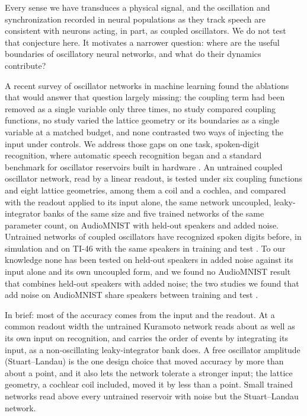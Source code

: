 \documentclass[10pt]{article}
\newcounter{none} %
\begin{document}
Every sense we have transduces a physical signal, and the oscillation
and synchronization recorded in neural populations as they track speech
\citep{assaneo2020, doelling2023, pittman-polletta2021, dogonasheva2026}
are consistent with neurons acting, in part, as coupled oscillators. We
do not test that conjecture here. It motivates a narrower question:
where are the useful boundaries of oscillatory neural networks, and what
do their dynamics contribute?

A recent survey of oscillator networks in machine learning
\citep{kryski2026} found the ablations that would answer that question
largely missing: the coupling term had been removed as a single variable
only three times, no study compared coupling functions, no study varied
the lattice geometry or its boundaries as a single variable at a matched
budget, and none contrasted two ways of injecting the input under
controls. We address those gaps on one task, spoken-digit recognition,
where automatic speech recognition began \citep{davis1952} and a
standard benchmark for oscillator reservoirs built in hardware
\citep{torrejon2017, shougat2023}. An untrained coupled oscillator
network, read by a linear readout, is tested under six coupling
functions and eight lattice geometries, among them a coil and a cochlea,
and compared with the readout applied to its input alone, the same
network uncoupled, leaky-integrator banks of the same size and five
trained networks of the same parameter count, on AudioMNIST
\citep{becker2024} with held-out speakers and added noise. Untrained
networks of coupled oscillators have recognized spoken digits before, in
simulation and on TI-46 with the same speakers in training and test
\citep{opala2019, coulombe2017}. To our knowledge none has been tested
on held-out speakers in added noise against its input alone and its own
uncoupled form, and we found no AudioMNIST result that combines held-out
speakers with added noise; the two studies we found that add noise on
AudioMNIST share speakers between training and test
\citep{beoletto2026, young2026}.

In brief: most of the accuracy comes from the input and the readout. At
a common readout width the untrained Kuramoto network reads about as
well as its own input on recognition, and carries the order of events by
integrating its input, as a non-oscillating leaky-integrator bank does.
A free oscillator amplitude (Stuart--Landau) is the one design choice
that moved accuracy by more than about a point, and it also lets the
network tolerate a stronger input; the lattice geometry, a cochlear coil
included, moved it by less than a point. Small trained networks read
above every untrained reservoir with noise but the Stuart--Landau
network.
\end{document}
